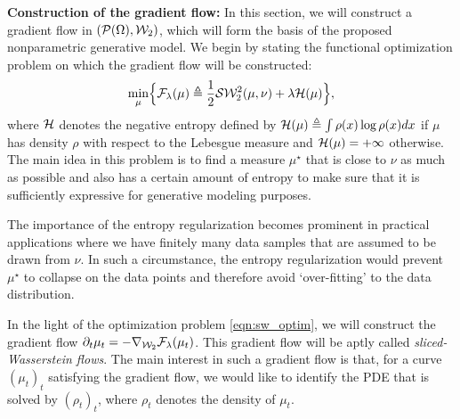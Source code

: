 

\vspace{-5pt}

\textbf{Construction of the gradient flow: }
%
In this section, we will construct a gradient flow in $({\cal P}(\Omega),{\cal W}_2)$, which will form the basis of the proposed nonparametric generative model. We begin by stating the functional optimization problem on which the gradient flow will be constructed:
\begin{align}
\min_\mu \Bigl\{ {\cal F}_\lambda(\mu) \triangleq  \frac1{2} {\cal S}{\cal W}_2^2(\mu, \nu) + \lambda {\cal H}(\mu) \Bigr\}, \label{eqn:sw_optim}
\end{align}
where ${\cal H}$ denotes the negative entropy defined by ${\cal H}(\mu) \triangleq \int \rho(x) \log \rho(x) dx $ if $\mu$ has density $\rho$ with respect to the Lebesgue measure and ${\cal H}(\mu) = + \infty$ otherwise. The main idea in this problem is to find a measure $\mu^\star$ that is close to $\nu$ as much as possible and also has a certain amount of entropy to make sure that it is sufficiently expressive for generative modeling purposes.

The importance of the entropy regularization becomes prominent in practical applications where we have finitely many data samples that are assumed to be drawn from $\nu$. In such a circumstance, the entropy regularization would prevent $\mu^\star$ to collapse on the data points and therefore avoid `over-fitting' to the data distribution.


In the light of the optimization problem \eqref{eqn:sw_optim}, we will construct the gradient flow $\partial_t \mu_t = - \nabla_{{\cal W}_2} {\cal F}_\lambda(\mu_t)$. This gradient flow will be aptly called \emph{sliced-Wasserstein flows}. The main interest in such a gradient flow is that, for a curve $(\mu_t)_t$ satisfying the gradient flow, we would like to identify the PDE that is solved by $(\rho_t)_t$, where $\rho_t$ denotes the density of $\mu_t$.

